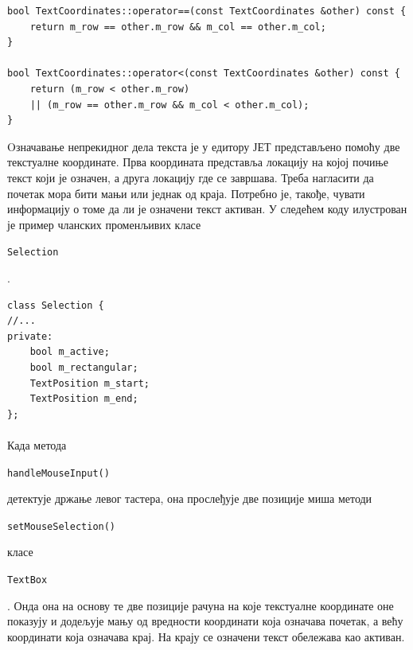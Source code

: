 \documentclass[12pt,oneside]{memoir}
\begin{document}
\begin{verbatim}
bool TextCoordinates::operator==(const TextCoordinates &other) const {
	return m_row == other.m_row && m_col == other.m_col;
}

bool TextCoordinates::operator<(const TextCoordinates &other) const {
	return (m_row < other.m_row) 
	|| (m_row == other.m_row && m_col < other.m_col);
}
\end{verbatim}

Oзначавање непрекидног дела текста је у едитору ЈЕТ представљено помоћу две текстуалне координате. Прва координата представља локацију на којој почиње текст који је
означен, а друга локацију где се завршава. Треба нагласити да почетак мора бити мањи или једнак од краја. Потребно је, такође, чувати информацију о томе да ли је означени текст активан. У следећем коду илустрован је пример чланских променљивих класе 
\begin{latinica}\verb|Selection|\end{latinica}.

\begin{verbatim}
class Selection {
//...
private:
	bool m_active;
	bool m_rectangular;
	TextPosition m_start;
	TextPosition m_end;
};
\end{verbatim}


\paragraph{}
Када метода \begin{latinica}\verb|handleMouseInput()|\end{latinica} детектује држање
левог тастера, она прослеђује две позиције миша методи \begin{latinica}\verb|setMouseSelection()|\end{latinica} класе
\begin{latinica}\verb|TextBox|\end{latinica}. Онда она на основу те две позиције
рачуна на које текстуалне координате оне показују и додељује мању од вредности координати
која означава почетак, а већу координати која означава крај. 
На крају се означени текст обележава као активан.
\end{document}
